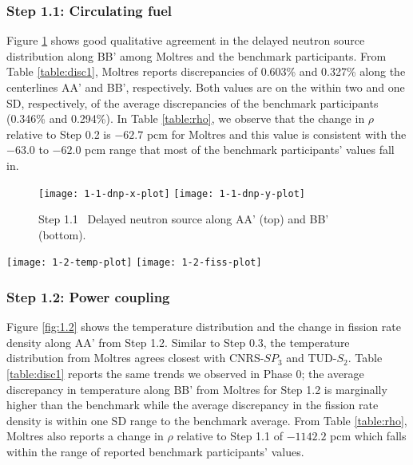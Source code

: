 \subsubsection{Step 1.1: Circulating fuel}

Figure \ref{fig:1.1} shows good qualitative agreement in the delayed neutron
source distribution along BB' among Moltres and the benchmark participants.
From Table \ref{table:disc1}, Moltres reports discrepancies of 0.603\% and
0.327\% along the centerlines AA' and BB', respectively. Both values are on the
within two and one \gls{SD}, respectively, of the average discrepancies of the
benchmark participants (0.346\% and 0.294\%).
In Table \ref{table:rho}, we observe that the change in
$\rho$ relative to Step 0.2 is $-62.7$ pcm for Moltres and this value is
consistent with the $-63.0$ to $-62.0$ pcm range that most of the benchmark
participants' values fall in.
%
\begin{figure}[h!]
	\centering
    \texttt{[image: 1-1-dnp-x-plot]}
    \texttt{[image: 1-1-dnp-y-plot]}
	\caption{Step 1.1 \textemdash\ Delayed neutron source along AA' (top) and BB'
	(bottom).}
	\label{fig:1.1}
\end{figure}
%
\begin{figure*}[htb]
	\centering
	\texttt{[image: 1-2-temp-plot]}
	\texttt{[image: 1-2-fiss-plot]}
	\caption{Step 1.2 \textemdash\ Temperature distribution and change in fission rate
	density along AA'.}
	\label{fig:1.2}
\end{figure*}

\FloatBarrier

\subsubsection{Step 1.2: Power coupling}

Figure \ref{fig:1.2} shows the temperature distribution and the change in
fission rate density along AA' from Step 1.2. Similar to Step 0.3, the
temperature distribution from Moltres agrees closest with CNRS-$SP_3$ and
TUD-$S_2$. Table \ref{table:disc1} reports the same trends we observed in Phase
0; the average discrepancy in temperature along BB' from Moltres for Step 1.2
is marginally higher than the benchmark while the average discrepancy in the
fission rate density is within one \gls{SD} range to the benchmark average.
From Table \ref{table:rho}, Moltres also reports a change in $\rho$
relative to Step 1.1 of $-1142.2$ pcm which
falls within the range of reported benchmark participants' values.

